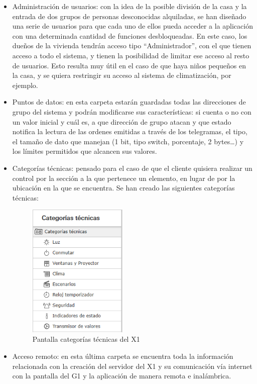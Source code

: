 \begin{itemize}
\item Administración de usuarios: con la idea de la posible división de la casa y la entrada de dos grupos de personas desconocidas alquiladas, se han diseñado una serie de usuarios para que cada uno de ellos pueda acceder a la aplicación con una determinada cantidad de funciones desbloqueadas. En este caso, los dueños de la vivienda tendrán acceso tipo “Administrador”, con el que tienen acceso a todo el sistema, y tienen la posibilidad de limitar ese acceso al resto de usuarios. Esto resulta muy útil en el caso de que haya niños pequeños en la casa, y se quiera restringir su acceso al sistema de climatización, por ejemplo. 
\item Puntos de datos: en esta carpeta estarán guardadas todas las direcciones de grupo del sistema y podrán modificarse sus características: si cuenta o no con un valor inicial y cuál es, a que dirección de grupo atacan y que estado notifica la lectura de las ordenes emitidas a través de los telegramas, el tipo, el tamaño de dato que manejan (1 bit, tipo switch, porcentaje, 2 bytes…) y los límites permitidos que alcancen sus valores.
\item Categorías técnicas: pensado para el caso de que el cliente quisiera realizar un control por la sección a la que pertenece un elemento, en lugar de por la ubicación en la que se encuentra. Se han creado las siguientes categorías técnicas: 
\begin{figure}[H]
\centering
\includegraphics[width=0.45\textwidth]{figures/prog_x1_2.png}   
\caption{Pantalla categorías técnicas del X1}
\label{fig:prog_x1_2}
\end{figure}
\item Acceso remoto: en esta última carpeta se encuentra toda la información relacionada con la creación del servidor del X1 y su comunicación vía internet con la pantalla del G1 y la aplicación de manera remota e inalámbrica.
\end{itemize}

